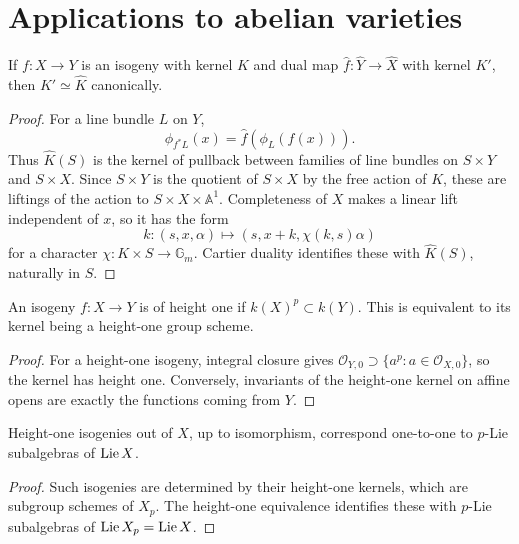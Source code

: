 \section{Applications to abelian varieties}
\label{mumford-III15-source}

\begin{theorem}
\label{mumford-thm-dual-isogeny-kernel}
If $f:X\to Y$ is an isogeny with kernel $K$ and dual map
$\widehat f:\widehat Y\to\widehat X$ with kernel $K'$, then
$K'\simeq\widehat K$ canonically.
\end{theorem}
\begin{proof}
For a line bundle $L$ on $Y$,
\[
\phi_{f^*L}(x)=\widehat f(\phi_L(f(x))).
\]
Thus $\widehat K(S)$ is the kernel of pullback between families of line
bundles on $S\times Y$ and $S\times X$. Since $S\times Y$ is the quotient
of $S\times X$ by the free action of $K$, these are liftings of the action
to $S\times X\times\mathbb A^1$. Completeness of $X$ makes a linear lift
independent of $x$, so it has the form
\[
k:(s,x,\alpha)\longmapsto(s,x+k,\chi(k,s)\alpha)
\]
for a character $\chi:K\times S\to\mathbb G_m$. Cartier duality identifies
these with $\widehat K(S)$, naturally in $S$.
\end{proof}

\begin{definition}
\label{mumford-def-height-one-isogeny}
An isogeny $f:X\to Y$ is of height one if $k(X)^p\subset k(Y)$.
This is equivalent to its kernel being a height-one group scheme.
\end{definition}
\begin{proof}
For a height-one isogeny, integral closure gives
$\mathcal O_{Y,0}\supset\{a^p:a\in\mathcal O_{X,0}\}$, so the kernel has
height one. Conversely, invariants of the height-one kernel on affine opens
are exactly the functions coming from $Y$.
\end{proof}

\begin{theorem}
\label{mumford-thm-height-one-isogeny}
Height-one isogenies out of $X$, up to isomorphism, correspond one-to-one to
$p$-Lie subalgebras of $\operatorname{Lie} X$.
\end{theorem}
\begin{proof}
Such isogenies are determined by their height-one kernels, which are
subgroup schemes of $X_p$. The height-one equivalence identifies these with
$p$-Lie subalgebras of $\operatorname{Lie} X_p=\operatorname{Lie} X$.
\end{proof}

